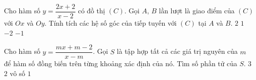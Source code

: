 \begin{ex}%
	Cho hàm số $y=\dfrac{2x+2}{x-2}$ có đồ thị $\left( C \right)$. Gọi $A$, $B$ lần lượt là giao điểm của $\left( C \right)$ với $Ox$ và $Oy$. Tính tích các hệ số góc của tiếp tuyến với $\left( C \right)$ tại $A$ và $B$.
	\choice
	{$2$}
	{\True $1$}
	{$-2$}
	{$-1$}
\end{ex}

\begin{ex}%
	
	Cho hàm số $y=\dfrac{mx+m-2}{x-m}$. Gọi $S$ là tập hợp tất cả các giá trị nguyên của $m$ để hàm số đồng biến trên từng khoảng xác định của nó. Tìm số phần tử của $S$. 
	\choice
	{$3$}
	{\True $2$}
	{vô số}
	{$1$}
\end{ex}

